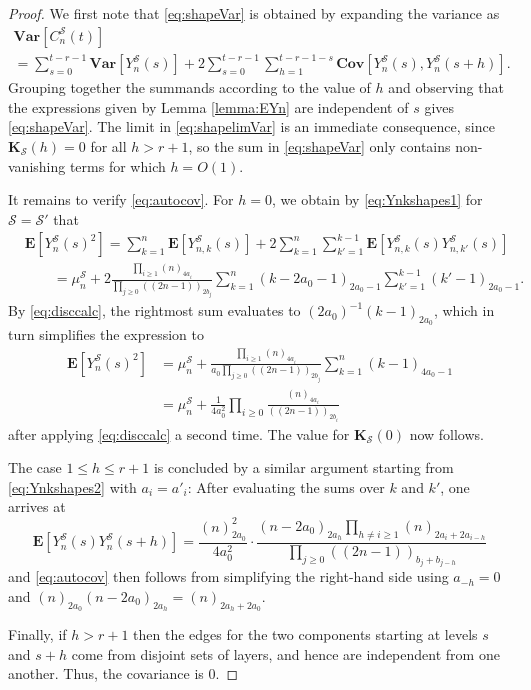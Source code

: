 \documentclass[a4paper,11pt,reqno]{amsart}
\newcommand{\bE}{\mathbf{E}}
\newcommand{\bVar}{\mathbf{Var}}
\newcommand{\bCov}{\mathbf{Cov}}
\newcommand{\shape}{\mathscr{S}}
\newcommand{\fdf}[1]{(\!(#1)\!)}
\newcommand{\mb}{\mathbf}
\theoremstyle{definition}
\begin{document}
\begin{proof}
 We first note that \eqref{eq:shapeVar} is obtained by expanding the variance as 
 \begin{multline*}
  \bVar\left[C_n^\shape(t)\right]\\
  = \sum_{s=0}^{t-r-1} \bVar\left[Y_n^\shape(s)\right] + 2 \sum_{s=0}^{t-r-1} \sum_{h=1}^{t-r-1-s} \bCov\left[Y_n^\shape(s),Y_n^\shape(s+h)\right]. 
 \end{multline*}
 Grouping together the summands according to the value of $h$ and observing that the expressions given by Lemma \ref{lemma:EYn} are independent of $s$ gives \eqref{eq:shapeVar}. The limit in \eqref{eq:shapelimVar} is an immediate consequence, since $\mb K_\shape(h)=0$ for all $h>r+1$, so the sum in \eqref{eq:shapeVar} only contains non-vanishing terms for which $h=O(1)$. 
 
 It remains to verify \eqref{eq:autocov}. For $h=0$, we obtain by \eqref{eq:Ynkshapes1} for $\shape=\shape'$ that
 \begin{align*}
  &\bE\left[Y_n^\shape(s)^2\right]
  = \sum_{k=1}^n \bE\left[Y_{n,k}^\shape(s)\right] + 2 \sum_{k=1}^n \sum_{k'=1}^{k-1} \bE\left[Y_{n,k}^\shape(s) Y_{n,k'}^\shape(s)\right]\\
  &\qquad= \mu_n^\shape + 2 \frac{\prod_{i\geq 1} (n)_{4a_i}}{\prod_{j\geq 0} \fdf{2n-1}_{2b_j}} \sum_{k=1}^n (k-2a_0-1)_{2a_0-1} \sum_{k'=1}^{k-1} (k'-1)_{2a_0-1}.
 \end{align*}
 By \eqref{eq:disccalc}, the rightmost sum evaluates to $(2a_0)^{-1}(k-1)_{2a_0}$, which in turn simplifies the expression to 
 \begin{align*}
  \bE\left[Y_n^\shape(s)^2\right]
  &= \mu_n^\shape + \frac{\prod_{i\geq 1} (n)_{4a_i}}{a_0 \prod_{j\geq 0} \fdf{2n-1}_{2b_j}} \sum_{k=1}^n (k-1)_{4a_0-1}\\ 
  &= \mu_n^\shape + \frac{1}{4a_0^2}\prod_{i\geq0}\frac{(n)_{4a_i}}{\fdf{2n-1}_{2b_i}}
 \end{align*}
 after applying \eqref{eq:disccalc} a second time. The value for $\mb K_\shape(0)$ now follows. 
 
 The case $1\leq h\leq r+1$ is concluded by a similar argument starting from \eqref{eq:Ynkshapes2} with $a_i=a'_i$: After evaluating the sums over $k$ and $k'$, one arrives at 
 \[
  \bE\left[Y_n^\shape(s)Y_n^\shape(s+h)\right]
  = \frac{(n)_{2a_0}^2}{4a_0^2} \cdot \frac{(n-2a_0)_{2a_h}\prod_{h\neq i\geq 1} (n)_{2a_i+2a_{i-h}}}{\prod_{j\geq 0} \fdf{2n-1}_{b_j+b_{j-h}} }
 \]
 and \eqref{eq:autocov} then follows from simplifying the right-hand side using $a_{-h}=0$ and $(n)_{2a_0}(n-2a_0)_{2a_h}=(n)_{2a_h+2a_0}$. 
 
 Finally, if $h>r+1$ then the edges for the two components starting at levels $s$ and $s+h$ come from disjoint sets of layers, and hence are independent from one another. Thus, the covariance is $0$. 
\end{proof}
\end{document}
